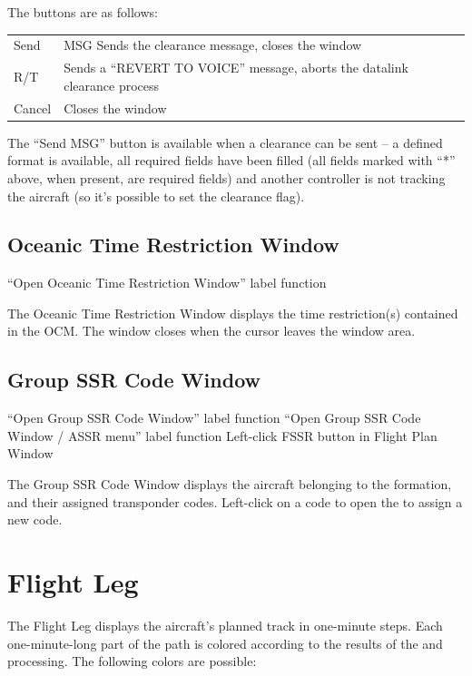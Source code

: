 \documentclass[a4paper,oneside,11pt]{memoir}
\begin{document}
The buttons are as follows:

\begin{longtable}{p{2.5cm} p{10cm}}
  Send    & MSG Sends the clearance message, closes the window\\
  R/T     & Sends a “REVERT TO VOICE” message, aborts the datalink clearance process\\
  Cancel  & Closes the window\\
\end{longtable}

The “Send MSG” button is available when a clearance can be sent – a defined format is available, all required fields have been filled (all fields marked with “*” above, when present, are required fields) and another controller is not tracking the aircraft (so it’s possible to set the clearance flag).

\subsection{Oceanic Time Restriction Window}\label{win:otrw}

“Open Oceanic Time Restriction Window” label function


The Oceanic Time Restriction Window displays the time restriction(s) contained in the OCM. The window closes when the cursor leaves the window area.

\subsection{Group SSR Code Window}\label{win:gssrcw}

“Open Group SSR Code Window” label function 
“Open Group SSR Code Window / ASSR menu” label function 
Left-click FSSR button in Flight Plan Window


The Group SSR Code Window displays the aircraft belonging to the formation, and their assigned transponder codes. Left-click on a code to open the  to assign a new code.

\section{Flight Leg}

The Flight Leg displays the aircraft’s planned track in one-minute steps. Each one-minute-long part of the
path is colored according to the results of the  and  processing. The following colors are possible:
\end{document}
